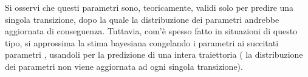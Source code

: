 Si osservi che questi parametri sono, teoricamente, validi solo per predire una singola transizione, dopo la quale la distribuzione dei parametri andrebbe aggiornata di conseguenza. Tuttavia, com'è spesso fatto in situazioni di questo tipo, si approssima la stima bayesiana congelando i parametri ai succitati parametri \emph{}, usandoli per la predizione di una intera traiettoria (\ie{} la distribuzione dei parametri non viene aggiornata ad ogni singola transizione).
